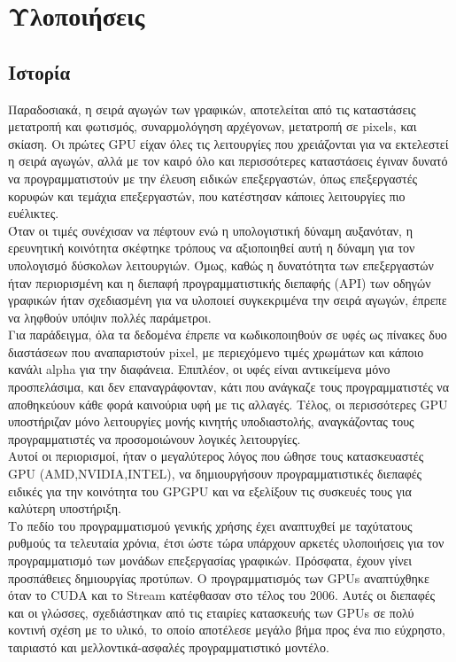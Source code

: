 \chapter{Υλοποιήσεις}
\section{Ιστορία}
Παραδοσιακά, η σειρά αγωγών των γραφικών, αποτελείται από τις καταστάσεις μετατροπή και φωτισμός, συναρμολόγηση αρχέγονων, μετατροπή σε pixels, και σκίαση. Οι πρώτες GPU είχαν όλες τις λειτουργίες που χρειάζονται για να εκτελεστεί η σειρά αγωγών, αλλά με τον καιρό όλο και περισσότερες καταστάσεις έγιναν δυνατό να προγραμματιστούν με την έλευση ειδικών επεξεργαστών, όπως επεξεργαστές κορυφών και τεμάχια επεξεργαστών, που κατέστησαν κάποιες λειτουργίες πιο ευέλικτες.\\

Όταν οι τιμές συνέχισαν να πέφτουν ενώ η υπολογιστική δύναμη αυξανόταν, η ερευνητική κοινότητα σκέφτηκε τρόπους να αξιοποιηθεί αυτή η δύναμη για τον υπολογισμό δύσκολων λειτουργιών. Όμως, καθώς η δυνατότητα των επεξεργαστών ήταν περιορισμένη και η διεπαφή προγραμματιστικής διεπαφής (API) των οδηγών γραφικών ήταν σχεδιασμένη για να υλοποιεί συγκεκριμένα την σειρά αγωγών, έπρεπε να ληφθούν υπόψιν πολλές παράμετροι.\\

Για παράδειγμα, όλα τα δεδομένα έπρεπε να κωδικοποιηθούν σε υφές ως πίνακες δυο διαστάσεων που αναπαριστούν pixel, με περιεχόμενο τιμές χρωμάτων και κάποιο κανάλι alpha για την διαφάνεια. Επιπλέον, οι υφές είναι αντικείμενα μόνο προσπελάσιμα, και δεν επαναγράφονταν, κάτι που ανάγκαζε τους προγραμματιστές να αποθηκεύουν κάθε φορά καινούρια υφή με τις αλλαγές. Τέλος, οι περισσότερες GPU υποστήριζαν μόνο λειτουργίες μονής κινητής υποδιαστολής, αναγκάζοντας τους προγραμματιστές να προσομοιώνουν λογικές λειτουργίες.\\

Αυτοί οι περιορισμοί, ήταν ο μεγαλύτερος λόγος που ώθησε τους κατασκευαστές GPU (AMD,NVIDIA,INTEL), να δημιουργήσουν προγραμματιστικές διεπαφές ειδικές για την κοινότητα του GPGPU και να εξελίξουν τις συσκευές τους για καλύτερη υποστήριξη.\\

Το πεδίο του προγραμματισμού γενικής χρήσης έχει αναπτυχθεί με ταχύτατους ρυθμούς τα τελευταία χρόνια, έτσι ώστε τώρα υπάρχουν αρκετές υλοποιήσεις για τον προγραμματισμό των μονάδων επεξεργασίας γραφικών. Πρόσφατα, έχουν γίνει προσπάθειες δημιουργίας προτύπων.
Ο προγραμματισμός των GPUs αναπτύχθηκε όταν το CUDA και το Stream κατέφθασαν στο τέλος του 2006. Αυτές οι διεπαφές και οι γλώσσες, σχεδιάστηκαν από τις εταιρίες κατασκευής των GPUs σε πολύ κοντινή σχέση με το υλικό, το οποίο αποτέλεσε μεγάλο βήμα προς ένα πιο εύχρηστο, ταιριαστό και μελλοντικά-ασφαλές προγραμματιστικό μοντέλο.\\

